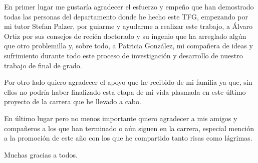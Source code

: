 
En primer lugar me gustaría agradecer el esfuerzo y empeño que han demostrado todas las personas del departamento donde he hecho este TFG, empezando por mi tutor Stefan Palzer, por guiarme y ayudarme a realizar este trabajo, a Álvaro Ortiz por sus consejos de recién doctorado y su ingenio que ha arreglado algún que otro problemilla y, sobre todo, a Patricia González, mi compañera de ideas y sufrimiento durante todo este proceso de investigación y desarrollo de nuestro trabajo de final de grado. 

Por otro lado quiero agradecer el apoyo que he recibido de mi familia ya que, sin ellos no podría haber finalizado esta etapa de mi vida plasmada en este último proyecto de la carrera que he llevado a cabo.

En último lugar pero no menos importante quiero agradecer a mis amigos y compañeros a los que han terminado o aún siguen en la carrera, especial mención a la promoción de este año con los que he compartido tanto risas como lágrimas. 

Muchas gracias a todos.
